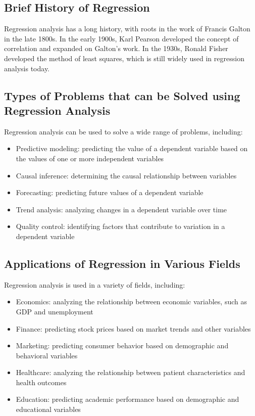 \documentclass{beamer}
\begin{document}
\subsection{Brief History of Regression}

Regression analysis has a long history, with roots in the work of Francis Galton in the late 1800s. In the early 1900s, Karl Pearson developed the concept of correlation and expanded on Galton's work. In the 1930s, Ronald Fisher developed the method of least squares, which is still widely used in regression analysis today.

\subsection{Types of Problems that can be Solved using Regression Analysis}

Regression analysis can be used to solve a wide range of problems, including:

\begin{itemize}
\item Predictive modeling: predicting the value of a dependent variable based on the values of one or more independent variables
\item Causal inference: determining the causal relationship between variables
\item Forecasting: predicting future values of a dependent variable
\item Trend analysis: analyzing changes in a dependent variable over time
\item Quality control: identifying factors that contribute to variation in a dependent variable
\end{itemize}

\subsection{Applications of Regression in Various Fields}

Regression analysis is used in a variety of fields, including:

\begin{itemize}
\item Economics: analyzing the relationship between economic variables, such as GDP and unemployment
\item Finance: predicting stock prices based on market trends and other variables
\item Marketing: predicting consumer behavior based on demographic and behavioral variables
\item Healthcare: analyzing the relationship between patient characteristics and health outcomes
\item Education: predicting academic performance based on demographic and educational variables
\end{itemize}
\end{document}
